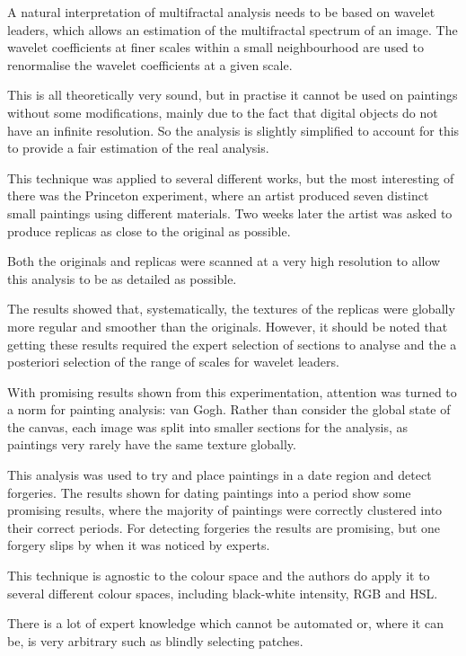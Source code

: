 \documentclass[conference]{IEEEtran}
\begin{document}
A natural interpretation of multifractal analysis needs to be based on wavelet
leaders, which allows an estimation of the multifractal spectrum of an image.
The wavelet coefficients at finer scales within a small neighbourhood are used
to renormalise the wavelet coefficients at a given scale.

This is all theoretically very sound, but in practise it cannot be used on
paintings without some modifications, mainly due to the fact that digital
objects do not have an infinite resolution. So the analysis is slightly
simplified to account for this to provide a fair estimation of the real
analysis.

This technique was applied to several different works, but the most interesting
of there was the Princeton experiment, where an artist produced seven distinct
small paintings using different materials. Two weeks later the artist was asked
to produce replicas as close to the original as possible.

Both the originals and replicas were scanned at a very high resolution to allow
this analysis to be as detailed as possible.

The results showed that, systematically, the textures of the replicas were
globally more regular and smoother than the originals. However, it should be
noted that getting these results required the expert selection of sections to
analyse and the a posteriori selection of the range of scales for wavelet
leaders.

With promising results shown from this experimentation, attention was turned to
a norm for painting analysis: van Gogh. Rather than consider the global state
of the canvas, each image was split into smaller sections for the analysis, as
paintings very rarely have the same texture globally.

This analysis was used to try and place paintings in a date region and detect
forgeries. The results shown for dating paintings into a period show some
promising results, where the majority of paintings were correctly clustered
into their correct periods. For detecting forgeries the results are promising,
but one forgery slips by when it was noticed by experts.

This technique is agnostic to the colour space and the authors do apply it to
several different colour spaces, including black-white intensity, \gls{RGB} and
\gls{HSL}.

There is a lot of expert knowledge which cannot be automated or, where it can
be, is very arbitrary such as blindly selecting patches.
\end{document}
